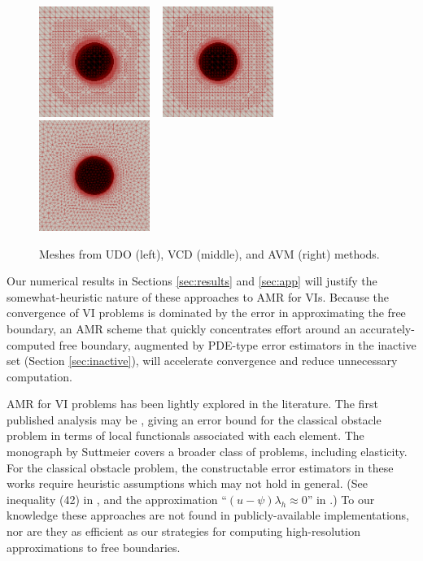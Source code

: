 \documentclass[]{interact}
\theoremstyle{plain}%
\theoremstyle{definition}
\theoremstyle{remark}
\begin{document}
\begin{figure}[ht]
\noindent \hspace{-1mm} \mbox{\includegraphics[width=0.32\textwidth]{static/sphereudo.png} \, \includegraphics[width=0.32\textwidth]{static/spherevcd.png} \,\,\includegraphics[width=0.32\textwidth]{static/sphereavm.png}}
\caption{Meshes from UDO (left), VCD (middle), and AVM (right) methods.}
\label{fig:threeballmeshes}
\end{figure}

Our numerical results in Sections \ref{sec:results} and \ref{sec:app} will justify the somewhat-heuristic nature of these approaches to AMR for VIs.  Because the convergence of VI problems is dominated by the error in approximating the free boundary, an AMR scheme that quickly concentrates effort around an accurately-computed free boundary, augmented by PDE-type error estimators in the inactive set (Section \ref{sec:inactive}), will accelerate convergence and reduce unnecessary computation.

AMR for VI problems has been lightly explored in the literature.  The first published analysis may be \cite{AinsworthOdenLee1993}, giving an error bound for the classical obstacle problem in terms of local functionals associated with each element.  The monograph by Suttmeier \cite{Suttmeier2008} covers a broader class of problems, including elasticity.  For the classical obstacle problem, the constructable error estimators in these works require heuristic assumptions which may not hold in general.  (See inequality (42) in \cite{AinsworthOdenLee1993}, and the approximation ``$(u-\psi)\lambda_h\approx 0$'' in \cite{Suttmeier2008}.)  To our knowledge these approaches are not found in publicly-available implementations, nor are they as efficient as our strategies for computing high-resolution approximations to free boundaries.
\end{document}
